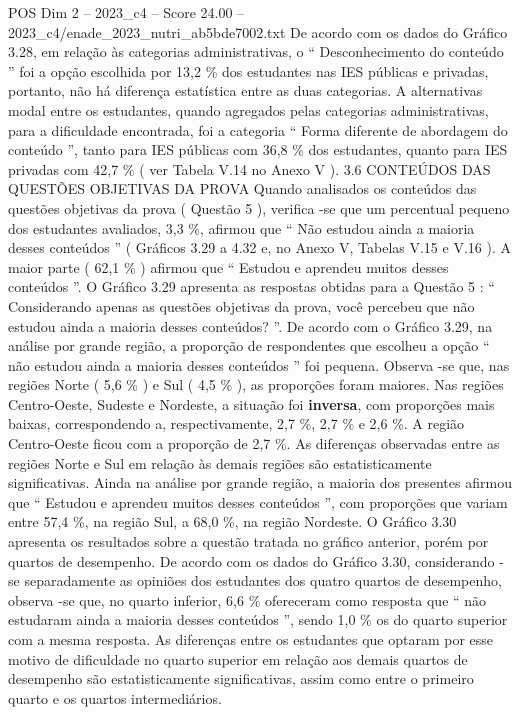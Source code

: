 \begin{textsample}{POS Dim 2 – 2023\_c4 – Score 24.00 – 2023\_c4/enade\_2023\_nutri\_ab5bde7002.txt}
De acordo com os dados do Gráfico 3.28, em relação às categorias administrativas, o “ Desconhecimento do conteúdo ” foi a opção escolhida por 13,2 \% dos estudantes nas IES públicas e privadas, portanto, não há diferença estatística entre as duas categorias.
A alternativas modal entre os estudantes, quando agregados pelas categorias administrativas, para a dificuldade encontrada, foi a categoria “ Forma diferente de abordagem do conteúdo ”, tanto para IES públicas com 36,8 \% dos estudantes, quanto para IES privadas com 42,7 \% ( ver Tabela V.14 no Anexo V ). 3.6 CONTEÚDOS DAS QUESTÕES OBJETIVAS DA PROVA Quando analisados os conteúdos das questões objetivas da prova ( Questão 5 ), verifica -se que um percentual pequeno dos estudantes avaliados, 3,3 \%, afirmou que “ Não estudou ainda a maioria desses conteúdos ” ( Gráficos 3.29 a 4.32 e, no Anexo V, Tabelas V.15 e V.16 ).
A maior parte ( 62,1 \% ) afirmou que “ Estudou e aprendeu muitos desses conteúdos ”.
O Gráfico 3.29 apresenta as respostas obtidas para a Questão 5 : “ Considerando apenas as questões objetivas da prova, você percebeu que não estudou ainda a maioria desses conteúdos? ”.
De acordo com o Gráfico 3.29, na análise por grande região, a proporção de respondentes que escolheu a opção “ não estudou ainda a maioria desses conteúdos ” foi pequena.
Observa -se que, nas regiões Norte ( 5,6 \% ) e Sul ( 4,5 \% ), as proporções foram maiores.
Nas regiões Centro-Oeste, Sudeste e Nordeste, a situação foi \textbf{inversa}, com proporções mais baixas, correspondendo a, respectivamente, 2,7 \%, 2,7 \% e 2,6 \%.
A região Centro-Oeste ficou com a proporção de 2,7 \%.
As diferenças observadas entre as regiões Norte e Sul em relação às demais regiões são estatisticamente significativas.
Ainda na análise por grande região, a maioria dos presentes afirmou que “ Estudou e aprendeu muitos desses conteúdos ”, com proporções que variam entre 57,4 \%, na região Sul, a 68,0 \%, na região Nordeste.
O Gráfico 3.30 apresenta os resultados sobre a questão tratada no gráfico anterior, porém por quartos de desempenho.
De acordo com os dados do Gráfico 3.30, considerando -se separadamente as opiniões dos estudantes dos quatro quartos de desempenho, observa -se que, no quarto inferior, 6,6 \% ofereceram como resposta que “ não estudaram ainda a maioria desses conteúdos ”, sendo 1,0 \% os do quarto superior com a mesma resposta.
As diferenças entre os estudantes que optaram por esse motivo de dificuldade no quarto superior em relação aos demais quartos de desempenho são estatisticamente significativas, assim como entre o primeiro quarto e os quartos intermediários.

\end{textsample}
